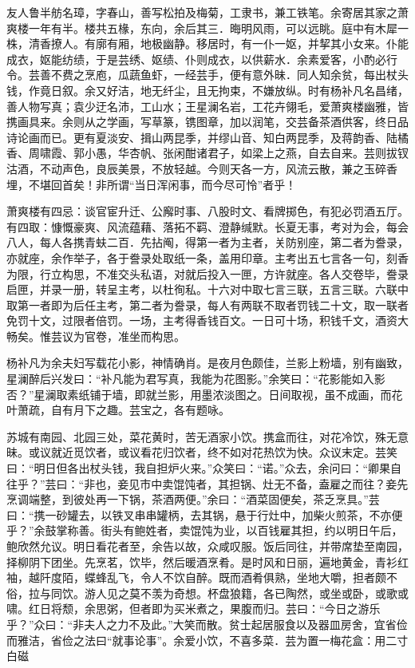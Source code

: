 \documentclass[]{article}
\begin{document}
友人鲁半舫名璋，字春山，善写松拍及梅菊，工隶书，兼工铁笔。余寄居其家之萧爽楼一年有半。楼共五椽，东向，余后其三．晦明风雨，可以远眺。庭中有木犀一株，清香撩人。有廓有厢，地极幽静。移居时，有一仆一妪，并挈其小女来。仆能成衣，妪能纺绩，于是芸绣、妪绩、仆则成衣，以供薪水．余素爱客，小酌必行令。芸善不费之烹庖，瓜蔬鱼虾，一经芸手，便有意外昧．同人知余贫，每出杖头钱，作竟日叙。余又好洁，地无纤尘，且无拘束，不嫌放纵。时有杨补凡名昌绪，善人物写真；袁少迂名沛，工山水；王星澜名岩，工花卉翎毛，爱萧爽楼幽雅，皆携画具来。余则从之学画，写草篆，镌图章，加以润笔，交芸备茶酒供客，终日品诗论画而已。更有夏淡安、揖山两昆季，并缪山音、知白两昆季，及蒋韵香、陆橘香、周啸霞、郭小愚，华杏帆、张闲酣诸君子，如梁上之燕，自去自来。芸则拔钗沽酒，不动声色，良辰美景，不放轻越。今则天各一方，风流云散，兼之玉碎香埋，不堪回首矣！非所谓``当日浑闲事，而今尽可怜''者乎！

萧爽楼有四忌：谈官宦升迁、公廨时事、八股时文、看牌掷色，有犯必罚酒五厅。有四取：慷慨豪爽、风流蕴藉、落拓不羁、澄静缄默。长夏无事，考对为会，每会八人，每人各携青蚨二百．先拈阄，得第一者为主者，关防别座，第二者为誊录，亦就座，余作举子，各于誊录处取纸一条，盖用印章。主考出五七言各一句，刻香为限，行立构思，不准交头私语，对就后投入一匣，方许就座。各人交卷毕，誊录启匣，并录一册，转呈主考，以杜徇私。十六对中取七言三联，五言三联。六联中取第一者即为后任主考，第二者为誊录，每人有两联不取者罚钱二十文，取一联者免罚十文，过限者倍罚。一场，主考得香钱百文。一日可十场，积钱千文，酒资大畅矣。惟芸议为官卷，准坐而构思。

杨补凡为余夫妇写载花小影，神情确肖。是夜月色颇佳，兰影上粉墙，别有幽致，星澜醉后兴发曰：``补凡能为君写真，我能为花图影。''余笑曰：``花影能如入影否？''星澜取素纸铺于墙，即就兰影，用墨浓淡图之。日间取视，虽不成画，而花叶萧疏，自有月下之趣。芸宝之，各有题咏。

苏城有南园、北园三处，菜花黄时，苦无酒家小饮。携盒而往，对花冷饮，殊无意昧。或议就近觅饮者，或议看花归饮者，终不如对花热饮为快。众议末定。芸笑曰：``明日但各出杖头钱，我自担炉火来。''众笑曰：``诺。''众去，余问曰：``卿果自往乎？''芸曰：``非也，妾见市中卖馄饨者，其担锅、灶无不备，盍雇之而往？妾先烹调端整，到彼处再一下锅，茶酒两便。''余曰：``酒菜固便矣，茶乏烹具。''芸曰：``携一砂罐去，以铁叉串串罐柄，去其锅，悬于行灶中，加柴火煎茶，不亦便乎？''余鼓掌称善。街头有鲍姓者，卖馄饨为业，以百钱雇其担，约以明日午后，鲍欣然允议。明日看花者至，余告以故，众咸叹服。饭后同往，并带席垫至南园，择柳阴下团坐。先烹茗，饮毕，然后暖酒烹肴。是时风和日丽，遍地黄金，青衫红袖，越阡度陌，蝶蜂乱飞，令人不饮自醉。既而酒肴俱熟，坐地大嚼，担者颇不俗，拉与同饮。游人见之莫不羡为奇想。杯盘狼籍，各已陶然，或坐或卧，或歌或啸。红日将颓，余思粥，但者即为买米煮之，果腹而归。芸曰：``今日之游乐乎？''众曰：``非夫人之力不及此。''大笑而散。贫士起居服食以及器皿房舍，宜省俭而雅洁，省俭之法曰``就事论事''。余爱小饮，不喜多菜．芸为置一梅花盒：用二寸白磁
\end{document}
